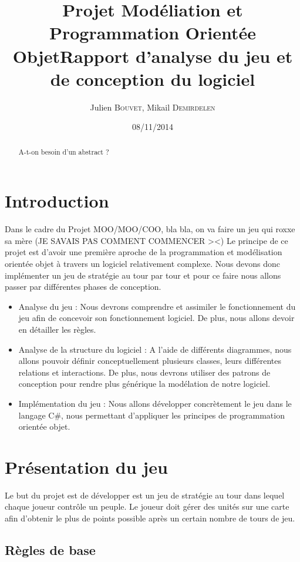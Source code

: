 \documentclass[12pt]{article}
\title{Projet Modéliation et Programmation Orientée Objet\smallbreak Rapport d'analyse du jeu et de conception du logiciel}
\author{Julien \textsc{Bouvet}, Mikail \textsc{Demirdelen} \\}
\date{08/11/2014}
\begin{document}
\maketitle
\newpage
\begin{abstract}
A-t-on besoin d'un abstract ?
\end{abstract}
\newpage
\tableofcontents
\newpage
\section{Introduction}

Dans le cadre du Projet MOO/MOO/COO, bla bla, on va faire un jeu qui roxxe sa mère (JE SAVAIS PAS COMMENT COMMENCER ><) \newline \newline
Le principe de ce projet est d'avoir une première aproche de la programmation et modélisation orientée objet à travers un logiciel relativement complexe. Nous devons donc implémenter un jeu de stratégie au tour par tour et pour ce faire nous allons passer par différentes phases de conception.
\begin{itemize}
  \item Analyse du jeu : Nous devrons comprendre et assimiler le fonctionnement du jeu afin de concevoir son fonctionnement logiciel. De plus, nous allons devoir en détailler les règles.
  \item Analyse de la structure du logiciel :  A l'aide de différents diagrammes, nous allons pouvoir définir conceptuellement plusieurs classes, leurs différentes relations et interactions. De plus, nous devrons utiliser des patrons de conception pour rendre plus générique la modélation de notre logiciel.
  \item Implémentation du jeu : Nous allons développer concrètement le jeu dans le langage C\#, nous permettant d'appliquer les principes de programmation orientée objet.
\end{itemize}
\newpage

\section{Présentation du jeu}
Le but du projet est de développer est un jeu de stratégie au tour dans lequel chaque joueur contrôle un peuple. Le joueur doit gérer des unités sur une carte afin d'obtenir le plus de points possible après un certain nombre de tours de jeu.
\subsection{Règles de base}
\end{document}
